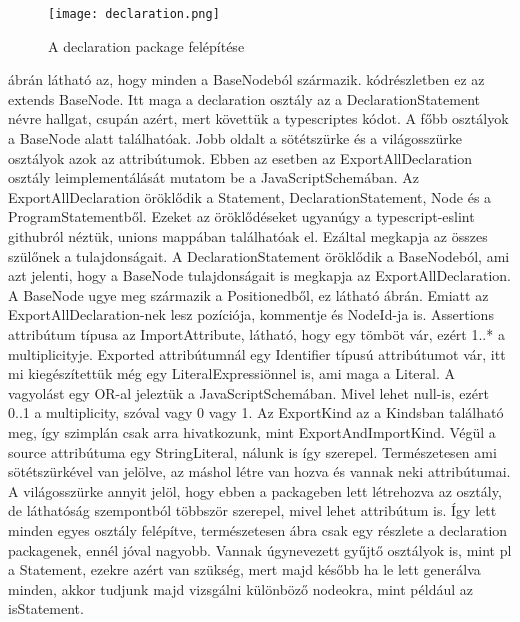 \begin{figure}[!htbp]
      \caption{A declaration package felépítése}\label{fig:declaration_vpp}
      \centering
      \texttt{[image: declaration.png]}
\end{figure}

 ábrán látható az, hogy minden a BaseNodeból származik.  kódrészletben ez az extends BaseNode.
Itt maga a declaration osztály az a DeclarationStatement névre hallgat, csupán azért, mert követtük a typescriptes kódot. A főbb osztályok a BaseNode alatt találhatóak.
Jobb oldalt a sötétszürke és a világosszürke osztályok azok az attribútumok.
Ebben az esetben az ExportAllDeclaration osztály leimplementálását mutatom be a JavaScriptSchemában.
Az ExportAllDeclaration öröklődik a Statement, DeclarationStatement, Node és a ProgramStatementből.
Ezeket az öröklődéseket ugyanúgy a typescript-eslint githubról néztük, unions mappában találhatóak el.
Ezáltal megkapja az összes szülőnek a tulajdonságait. A DeclarationStatement öröklődik a BaseNodeból, ami azt jelenti, hogy a BaseNode tulajdonságait is megkapja az ExportAllDeclaration.
A BaseNode ugye meg származik a Positionedből, ez látható  ábrán.
Emiatt az ExportAllDeclaration-nek lesz pozíciója, kommentje és NodeId-ja is.
Assertions attribútum típusa az ImportAttribute, látható, hogy egy tömböt vár, ezért 1..* a multiplicityje.
Exported attribútumnál egy Identifier típusú attribútumot vár, itt mi kiegészítettük még egy LiteralExpressiönnel is, ami maga a Literal.
A vagyolást egy OR-al jeleztük a JavaScriptSchemában.
Mivel lehet null-is, ezért 0..1 a multiplicity, szóval vagy 0 vagy 1.
Az ExportKind az a Kindsban található meg, így szimplán csak arra hivatkozunk, mint ExportAndImportKind.
Végül a source attribútuma egy StringLiteral, nálunk is így szerepel.
Természetesen ami sötétszürkével van jelölve, az máshol létre van hozva és vannak neki attribútumai.
A világosszürke annyit jelöl, hogy ebben a packageben lett létrehozva az osztály, de láthatóság szempontból többször szerepel, mivel lehet attribútum is.
Így lett minden egyes osztály felépítve, természetesen  ábra csak egy részlete a declaration packagenek, ennél jóval nagyobb.
Vannak úgynevezett gyűjtő osztályok is, mint pl a Statement, ezekre azért van szükség, mert majd később ha le lett generálva minden, akkor tudjunk majd vizsgálni különböző nodeokra, mint például az isStatement.

\noindent

